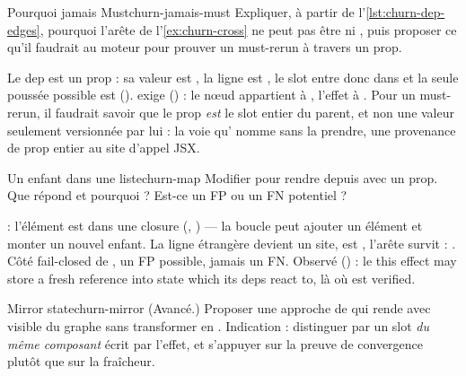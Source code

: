 \begin{exercice}{Pourquoi jamais Must}{churn-jamais-must}
Expliquer, à partir de l'\cref{lst:churn-dep-edges}, pourquoi l'arête de
l'\cref{ex:churn-cross} ne peut pas être  ni , puis proposer ce
qu'il faudrait au moteur pour prouver un must-rerun à travers un prop.
\end{exercice}
\begin{solution}
Le dep  est un prop : sa valeur est , la ligne
 est , le slot entre donc dans
 et la seule poussée possible est 
().  exige 
() : le nœud appartient à , l'effet à
. Pour un must-rerun, il faudrait savoir que le prop \emph{est} le slot entier
du parent, et non une valeur seulement versionnée par lui : la voie qu' nomme sans
la prendre, une provenance de prop entier au site d'appel JSX.
\end{solution}

\begin{exercice}{Un enfant dans une liste}{churn-map}
Modifier  pour rendre  depuis
 avec  un prop. Que
répond  et pourquoi ? Est-ce un FP ou un FN potentiel ?
\end{exercice}
\begin{solution}
 : l'élément est dans une closure (,
) --- la boucle peut ajouter un élément et monter un
nouvel enfant. La ligne étrangère devient un site,  est ,
l'arête  survit : \Warning. Côté fail-closed de , un FP possible,
jamais un FN. Observé () : le \Warning{} \og this effect may
store a fresh reference into state  which its deps react to\fg{}, là où
 est \og verified\fg.
\end{solution}

\begin{exercice}{Mirror state}{churn-mirror}
(Avancé.) Proposer une approche de  qui rende  avec
 visible du graphe sans transformer
 en \Warning. Indication : distinguer  par un
slot \emph{du même composant} écrit par l'effet, et s'appuyer sur la preuve de convergence
plutôt que sur la fraîcheur.
\end{exercice}
